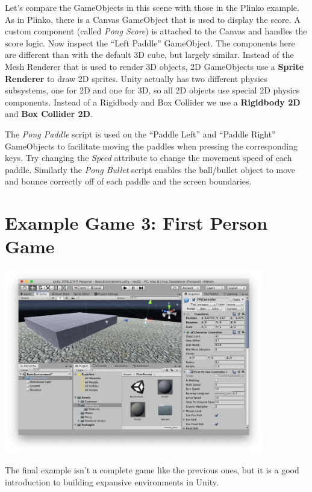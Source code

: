 \documentclass[11pt]{article}
\begin{document}
Let's compare the GameObjects in this scene with those in the Plinko example.  As in Plinko, there is a Canvas GameObject that is used to display the score.  A custom component (called \textit{Pong Score}) is attached to the Canvas and handles the score logic.  Now inspect the ``Left Paddle'' GameObject.  The components here are different than with the default 3D cube, but largely similar.  Instead of the Mesh Renderer that is used to render 3D objects, 2D GameObjects use a \textbf{Sprite Renderer} to draw 2D sprites.  Unity actually has two different physics subsystems, one for 2D and one for 3D, so all 2D objects use special 2D physics components.  Instead of a Rigidbody and Box Collider we use a \textbf{Rigidbody 2D} and \textbf{Box Collider 2D}.

The \textit{Pong Paddle} script is used on the ``Paddle Left'' and ``Paddle Right'' GameObjects to facilitate moving the paddles when pressing the corresponding keys.  Try changing the \textit{Speed} attribute to change the movement speed of each paddle.  Similarly the \textit{Pong Bullet} script enables the ball/bullet object to move and bounce correctly off of each paddle and the screen boundaries.

\section{Example Game 3: First Person Game}

\begin{center}
\centering \noindent
\includegraphics[width=0.85\textwidth]{fpsgame}
\end{center}

The final example isn't a complete game like the previous ones, but it is a good introduction to building expansive environments in Unity.
\end{document}
